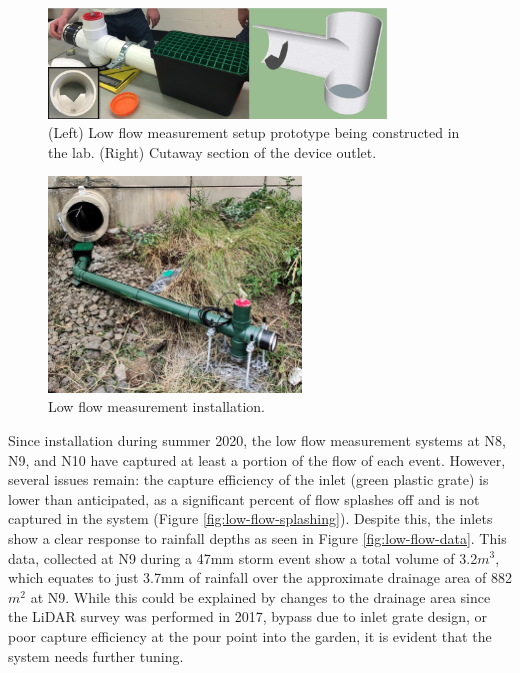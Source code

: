\begin{figure}[ht!]
	\centering
	\includegraphics[width=0.8\textwidth]{gfx/chapter-instrumentation/low-flow-setup.png}
	\caption[Low flow measurement setup]{(Left) Low flow measurement setup prototype being constructed in the lab. (Right) Cutaway section of the device outlet.}
	\label{fig:low-flow-setup}
\end{figure}

\begin{figure}[ht!]
	\centering
	\includegraphics[width=0.6\textwidth]{gfx/chapter-instrumentation/lf-field-install.jpg}
	\caption{Low flow measurement installation.}
	\label{fig:low-flow-install}
\end{figure}

Since installation during summer 2020, the low flow measurement systems at N8, N9, and N10 have captured at least a portion of the flow of each event.
However, several issues remain: the capture efficiency of the inlet (green plastic grate) is lower than anticipated, as a significant percent of flow splashes off and is not captured in the system (Figure \ref{fig:low-flow-splashing}).
Despite this, the inlets show a clear response to rainfall depths as seen in Figure \ref{fig:low-flow-data}.
This data, collected at N9 during a 47mm storm event show a total volume of 3.2$m^{3}$, which equates to just 3.7mm of rainfall over the approximate drainage area of 882$m^{2}$ at N9.
While this could be explained by changes to the drainage area since the LiDAR survey was performed in 2017, bypass due to inlet grate design, or poor capture efficiency at the pour point into the garden, it is evident that the system needs further tuning.

